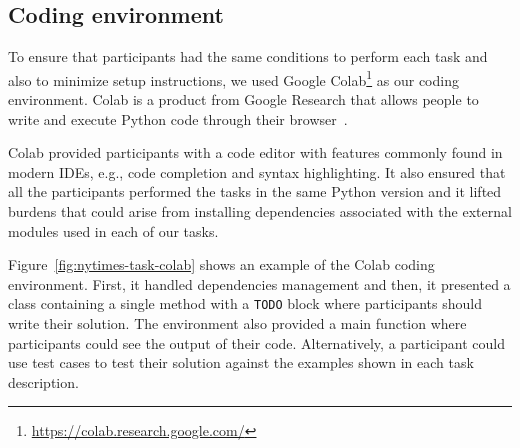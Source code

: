 


\subsection{Coding environment}
\label{cp6:coding-environment}



To ensure that participants had the same conditions to perform each task
and also to minimize setup instructions, we used Google Colab\footnote{\url{https://colab.research.google.com/}} as our coding environment. 
Colab is a product from Google Research that allows people to write and execute Python code through their browser~\cite{google-colab}. 






Colab provided participants with a code editor with features commonly found in modern IDEs, e.g., code completion and syntax highlighting. It also ensured that all the participants 
performed the tasks in the same Python version and it lifted 
burdens that could arise from installing dependencies associated with the external modules used in each of our tasks. 


Figure~\ref{fig:nytimes-task-colab} shows an example of the Colab coding environment. 
First, it handled dependencies management and then, 
it presented a class containing a single method with a \texttt{TODO} block where 
participants should write their solution. 
The environment also provided a main function where participants could see the output
of their code. Alternatively, a participant could use test cases to test their solution
against the examples shown in each task description.





